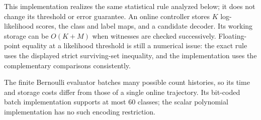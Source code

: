 This implementation realizes the same statistical rule analyzed below; it
does not change its threshold or error guarantee. An online controller stores
$K$ log-likelihood scores, the class and label maps, and a candidate decoder.
Its working storage can be $O(K+M)$ when witnesses are checked successively.
Floating-point equality at a likelihood threshold is still a numerical issue:
the exact rule uses the displayed strict surviving-set inequality, and the
implementation uses the complementary comparisons consistently.

The finite Bernoulli evaluator batches many possible count histories, so its
time and storage costs differ from those of a single online trajectory.
Its bit-coded batch implementation supports at most 60 classes; the scalar
polynomial implementation has no such encoding restriction.

